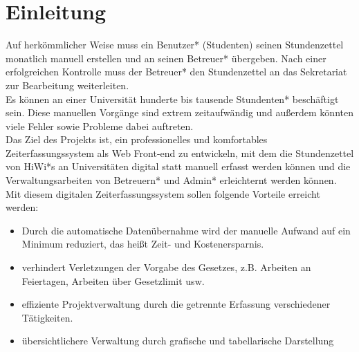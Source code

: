 \section{Einleitung}

Auf herkömmlicher Weise muss ein Benutzer* (Studenten) seinen Stundenzettel monatlich manuell erstellen und an seinen Betreuer* übergeben. Nach einer erfolgreichen Kontrolle muss der Betreuer* den Stundenzettel an das Sekretariat zur Bearbeitung weiterleiten. \\

Es können an einer Universität hunderte bis tausende Stundenten* beschäftigt sein. Diese manuellen Vorgänge sind extrem zeitaufwändig und außerdem könnten viele Fehler sowie Probleme dabei auftreten.\\

Das Ziel des Projekts ist, ein professionelles und komfortables Zeiterfassungssystem als Web Front-end zu entwickeln, mit dem die Stundenzettel von HiWi*s an Universitäten digital statt manuell erfasst werden können und die Verwaltungsarbeiten von Betreuern* und Admin* erleichternt werden können.\\

Mit diesem digitalen Zeiterfassungssystem sollen folgende Vorteile erreicht werden:\\

\begin{itemize}
	\item Durch die automatische Datenübernahme wird der manuelle Aufwand auf ein Minimum reduziert, das heißt Zeit- und Kostenersparnis.
	\item verhindert Verletzungen der Vorgabe des Gesetzes, z.B. Arbeiten an Feiertagen, Arbeiten über Gesetzlimit usw.
	\item effiziente Projektverwaltung durch die getrennte Erfassung verschiedener Tätigkeiten.
	\item übersichtlichere Verwaltung durch grafische und tabellarische Darstellung

\end{itemize}
